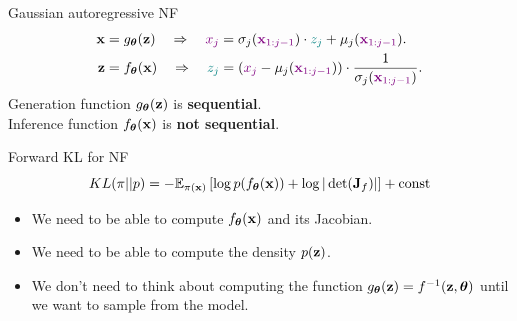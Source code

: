 \begin{frame}{Gaussian autoregressive NF}
	\vspace{-0.5cm}
	\begin{align*}
		\mathbf{x} &= g_{\boldsymbol{\theta}}(\mathbf{z}) \quad \Rightarrow \quad {\color{violet} x_j} = \sigma_j ({\color{violet} \mathbf{x}_{1:j-1}}) \cdot {\color{teal} z_j} + \mu_j({\color{violet} \mathbf{x}_{1:j-1}}). \\
		\mathbf{z} &= f_{\boldsymbol{\theta}}(\mathbf{x}) \quad \Rightarrow \quad {\color{teal} z_j} = \left({\color{violet}x_j} - \mu_j({\color{violet}\mathbf{x}_{1:j-1}}) \right) \cdot \frac{1}{ \sigma_j ({\color{violet}\mathbf{x}_{1:j-1}})}.
	\end{align*}
	Generation function $g_{\boldsymbol{\theta}}(\mathbf{z})$ is \textbf{sequential}. \\ Inference function $f_{\boldsymbol{\theta}}(\mathbf{x})$ is \textbf{not sequential}.

	\begin{block}{Forward KL for NF}
		\vspace{-0.2cm}
		\[
			KL(\pi || p)  = - \mathbb{E}_{\pi(\mathbf{x})} \left[\log p(f_{\boldsymbol{\theta}}(\mathbf{x})) + \log  |\det (\mathbf{J}_f)|\right] + \text{const} 
		\]
		\vspace{-0.5cm}
		\begin{itemize}
			\item We need to be able to compute $f_{\boldsymbol{\theta}}(\mathbf{x})$ and its Jacobian.
			\item We need to be able to compute the density $p(\mathbf{z})$.
			\item We don’t need to think about computing the function $g_{\boldsymbol{\theta}}(\mathbf{z}) = f^{-1}(\mathbf{z}, \boldsymbol{\theta})$ until we want to sample from the model.
		\end{itemize}
	\end{block}
\end{frame}
